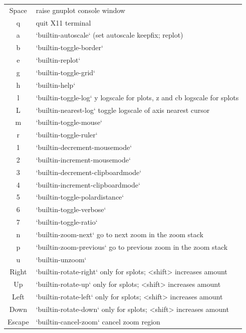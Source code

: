 \documentclass{beamer}
\begin{document}
\begin{frame}
\begin{scriptsize}
\begin{tabular}{c l}
Space      &   raise gnuplot console window \\
 q         &    quit X11 terminal \\
 a         &    `builtin-autoscale` (set autoscale keepfix; replot) \\
 b         &    `builtin-toggle-border` \\
 e         &    `builtin-replot` \\
 g         &    `builtin-toggle-grid` \\
 h         &    `builtin-help` \\
 l         &    `builtin-toggle-log` y logscale for plots, z and cb logscale for splots \\
 L         &    `builtin-nearest-log` toggle logscale of axis nearest cursor \\
 m         &    `builtin-toggle-mouse` \\
 r         &    `builtin-toggle-ruler` \\
 1         &    `builtin-decrement-mousemode` \\
 2         &    `builtin-increment-mousemode` \\
 3         &    `builtin-decrement-clipboardmode` \\
 4         &    `builtin-increment-clipboardmode` \\
 5         &    `builtin-toggle-polardistance` \\
 6         &    `builtin-toggle-verbose` \\
 7         &    `builtin-toggle-ratio` \\
 n         &    `builtin-zoom-next` go to next zoom in the zoom stack \\
 p         &    `builtin-zoom-previous` go to previous zoom in the zoom stack \\
 u         &    `builtin-unzoom` \\
 Right     &    `builtin-rotate-right` only for splots; \textless shift\textgreater{} increases amount \\
 Up        &    `builtin-rotate-up` only for splots; \textless shift\textgreater{} increases amount \\
 Left      &    `builtin-rotate-left` only for splots; \textless shift\textgreater{} increases amount \\
 Down      &    `builtin-rotate-down` only for splots; \textless shift\textgreater{} increases amount \\
 Escape    &    `builtin-cancel-zoom` cancel zoom region
\end{tabular}
\end{scriptsize}
\end{frame}
\end{document}
